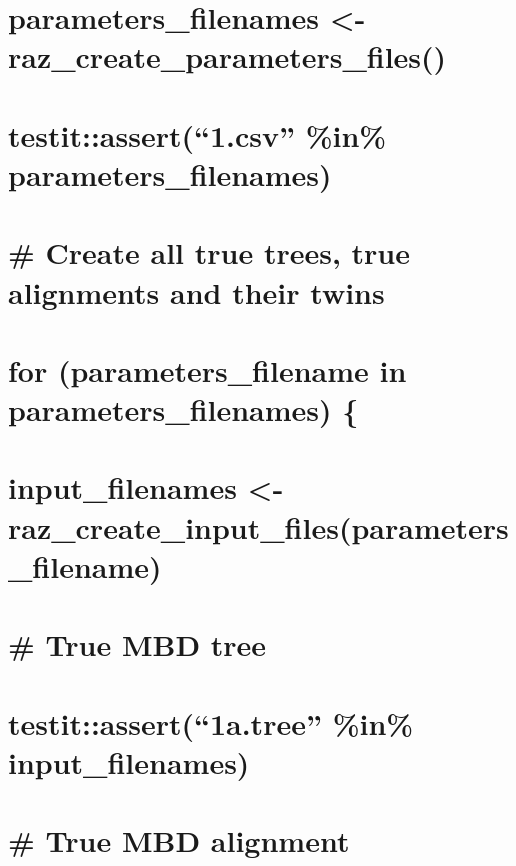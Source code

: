 \documentclass[]{article}
\begin{document}
\section{parameters\_filenames \textless{}-
raz\_create\_parameters\_files()}\label{parameters_filenames---raz_create_parameters_files}

\section{\texorpdfstring{testit::assert(``1.csv'' \%in\%
parameters\_filenames)}{testit::assert(1.csv \%in\% parameters\_filenames)}}\label{testitassert1.csv-in-parameters_filenames}

\section{}\label{section}

\section{\# Create all true trees, true alignments and their
twins}\label{create-all-true-trees-true-alignments-and-their-twins}

\section{for (parameters\_filename in parameters\_filenames)
\{}\label{for-parameters_filename-in-parameters_filenames}

\section{input\_filenames \textless{}-
raz\_create\_input\_files(parameters\_filename)}\label{input_filenames---raz_create_input_filesparameters_filename}

\section{\# True MBD tree}\label{true-mbd-tree}

\section{\texorpdfstring{testit::assert(``1a.tree'' \%in\%
input\_filenames)}{testit::assert(1a.tree \%in\% input\_filenames)}}\label{testitassert1a.tree-in-input_filenames}

\section{\# True MBD alignment}\label{true-mbd-alignment}
\end{document}
